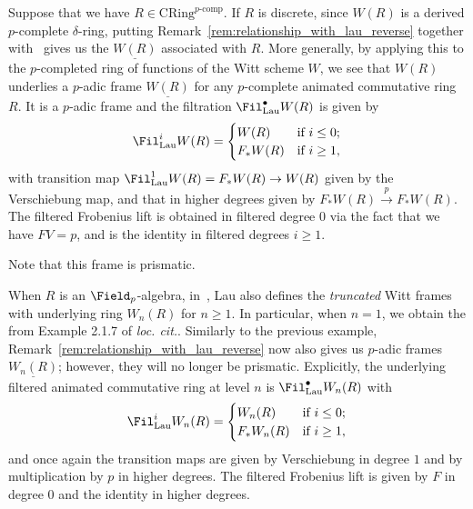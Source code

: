 \documentclass[10pt]{amsart}
\begin{document}
\begin{example}
\label{example:witt_frame}
Suppose that we have $R\in \mathrm{CRing}^{p\text{-comp}}$. If $R$ is discrete, since $W(R)$ is a derived $p$-complete $\delta$-ring, putting Remark~\ref{rem:relationship_with_lau_reverse} together with~\cite[Example 2.1.3]{MR4355476} gives us the  $\underline{W(R)}$ associated with $R$. More generally, by applying this to the $p$-completed ring of functions of the Witt scheme $W$, we see that $W(R)$ underlies a $p$-adic frame $\underline{W(R)}$ for any $p$-complete animated commutative ring $R$. It is a $p$-adic frame and the filtration $\Fil^\bullet_{\mathrm{Lau}}W(R)$ is given by 
\[
\Fil^i_{\mathrm{Lau}}W(R) = \begin{cases}
W(R)&\text{if $i\leq 0$};\\
F_*W(R)&\text{if $i \ge 1$},
\end{cases}
\]
with transition map $\Fil^1_{\mathrm{Lau}}W(R) =F_*W(R)\to W(R)$ given by the Verschiebung map, and that in higher degrees given by $F_*W(R)\xrightarrow{p}F_*W(R)$. The filtered Frobenius lift is obtained in filtered degree $0$ via the fact that we have $FV = p$, and is the identity in filtered degrees $i\ge 1$.

Note that this frame is prismatic.
\end{example}

\begin{example}
\label{example:truncated_witt_frames}
When $R$ is an $\Field_p$-algebra, in~\cite[Example 2.1.6]{MR4355476}, Lau also defines the \emph{truncated} Witt frames with underlying ring $W_n(R)$ for $n\ge 1$. In particular, when $n=1$, we obtain the  from Example 2.1.7 of \emph{loc. cit.}. Similarly to the previous example, Remark~\ref{rem:relationship_with_lau_reverse} now also gives us $p$-adic frames $\underline{W_n(R)}$; however, they will no longer be prismatic. Explicitly, the underlying filtered animated commutative ring at level $n$ is $\Fil^\bullet_{\mathrm{Lau}}W_n(R)$ with 
\[
\Fil^i_{\mathrm{Lau}}W_n(R) = \begin{cases}
W_n(R)&\text{if $i\leq 0$};\\
F_*W_n(R)&\text{if $i \ge 1$},
\end{cases}
\]
and once again the transition maps are given by Verschiebung in degree $1$ and by multiplication by $p$ in higher degrees. The filtered Frobenius lift is given by $F$ in degree $0$ and the identity in higher degrees.
\end{example}
\end{document}
